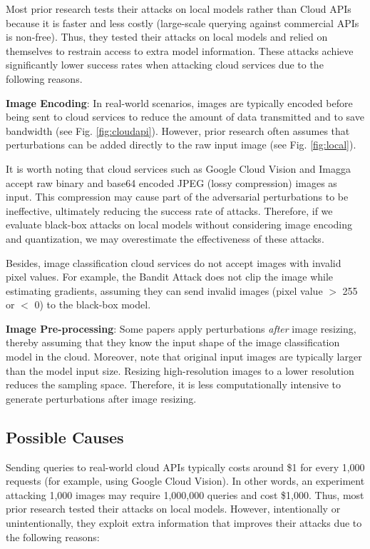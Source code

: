 Most prior research tests their attacks on local models rather than Cloud APIs because it is faster and less costly (large-scale querying against commercial APIs is non-free). Thus, they tested their attacks on local models and relied on themselves to restrain access to extra model information. These attacks achieve significantly lower success rates when attacking cloud services due to the following reasons.

\textbf{Image Encoding}: In real-world scenarios, images are typically encoded before being sent to cloud services to reduce the amount of data transmitted and to save bandwidth (see Fig. \ref{fig:cloudapi}). However, prior research often assumes that perturbations can be added directly to the raw input image (see Fig. \ref{fig:local}). 

It is worth noting that cloud services such as Google Cloud Vision and Imagga accept raw binary and base64 encoded JPEG (lossy compression) images as input. This compression may cause part of the adversarial perturbations to be ineffective, ultimately reducing the success rate of attacks. Therefore, if we evaluate black-box attacks on local models without considering image encoding and quantization, we may overestimate the effectiveness of these attacks. %

Besides, image classification cloud services do not accept images with invalid pixel values. For example, the Bandit Attack does not clip the image while estimating gradients, assuming they can send invalid images (pixel value $>$ 255 or $<$ 0) to the black-box model.

\textbf{Image Pre-processing}: Some papers apply perturbations \emph{after} image resizing, thereby assuming that they know the input shape of the image classification model in the cloud. Moreover, note that original input images are typically larger than the model input size. Resizing high-resolution images to a lower resolution reduces the sampling space. Therefore, it is less computationally intensive to generate perturbations after image resizing.

\subsection{Possible Causes}

Sending queries to real-world cloud APIs typically costs around \$1 for every 1,000 requests (for example, using Google Cloud Vision). In other words, an experiment attacking 1,000 images may require 1,000,000 queries and cost \$1,000. Thus, most prior research tested their attacks on local models. However, intentionally or unintentionally, they exploit extra information that improves their attacks due to the following reasons:

